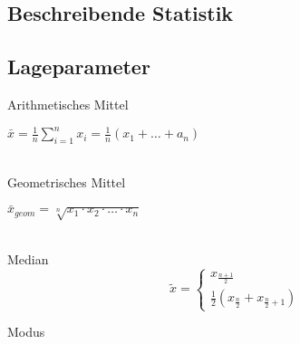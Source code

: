\documentclass[10pt,a4paper,landscape]{article}
\begin{document}
\begin{multicols}{4}
\section{Beschreibende Statistik}
\subsection{Lageparameter}
Arithmetisches Mittel \\
\parbox{\columnwidth}{\centering$\bar{x}=\frac{1}{n}\sum \limits_{i=1}^n x_i=\frac{1}{n}(x_1 + \dots + a_n)$}\\

Geometrisches Mittel \\
\parbox{\columnwidth}{\centering$\bar{x}_{geom} = \sqrt[n]{x_1 \cdot x_2 \cdot \dots \cdot x_n}$}\\

Median \\
\[\tilde{x}=\begin{cases}x_{\frac{n+1}{2}}\\\frac{1}{2}(x_{\frac{n}{2}}+x_{\frac{n}{2}+1})\end{cases}\]

Modus \\


\end{multicols}
\end{document}
